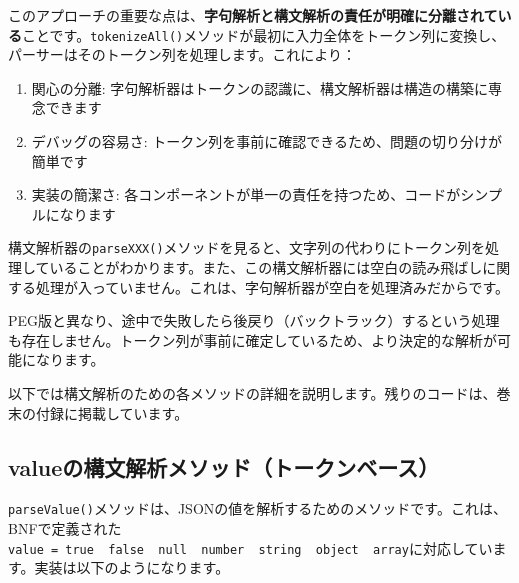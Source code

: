 このアプローチの重要な点は、\textbf{字句解析と構文解析の責任が明確に分離されている}ことです。\texttt{tokenizeAll()}メソッドが最初に入力全体をトークン列に変換し、パーサーはそのトークン列を処理します。これにより：

\begin{enumerate}
\def\labelenumi{\arabic{enumi}.}
\tightlist
\item
  関心の分離:
  字句解析器はトークンの認識に、構文解析器は構造の構築に専念できます
\item
  デバッグの容易さ:
  トークン列を事前に確認できるため、問題の切り分けが簡単です
\item
  実装の簡潔さ:
  各コンポーネントが単一の責任を持つため、コードがシンプルになります
\end{enumerate}

構文解析器の\texttt{parseXXX()}メソッドを見ると、文字列の代わりにトークン列を処理していることがわかります。また、この構文解析器には空白の読み飛ばしに関する処理が入っていません。これは、字句解析器が空白を処理済みだからです。

PEG版と異なり、途中で失敗したら後戻り（バックトラック）するという処理も存在しません。トークン列が事前に確定しているため、より決定的な解析が可能になります。

以下では構文解析のための各メソッドの詳細を説明します。残りのコードは、巻末の付録に掲載しています。

\hypertarget{chapter3-valueux306eux69cbux6587ux89e3ux6790ux30e1ux30bdux30c3ux30c9ux30c8ux30fcux30afux30f3ux30d9ux30fcux30b9}{%
\subsection{valueの構文解析メソッド（トークンベース）}\label{chapter3-valueux306eux69cbux6587ux89e3ux6790ux30e1ux30bdux30c3ux30c9ux30c8ux30fcux30afux30f3ux30d9ux30fcux30b9}}

\texttt{parseValue()}メソッドは、JSONの値を解析するためのメソッドです。これは、BNFで定義された\texttt{value\ =\ true\ \textbar{}\ false\ \textbar{}\ null\ \textbar{}\ number\ \textbar{}\ string\ \textbar{}\ object\ \textbar{}\ array}に対応しています。実装は以下のようになります。

